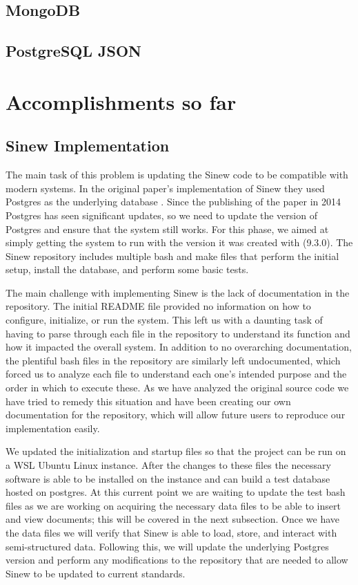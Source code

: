 \documentclass[sigconf]{acmart}
\begin{document}
    \subsection{MongoDB}


    \subsection{PostgreSQL JSON}

\section{Accomplishments so far}
    \subsection{Sinew Implementation}
    The main task of this problem is updating the Sinew code to be compatible with modern systems. In the original paper's implementation of Sinew they used Postgres as the underlying database \cite{Tahara_Diamond_Abadi_2014}. Since the publishing of the paper in 2014 Postgres has seen significant updates, so we need to update the version of Postgres and ensure that the system still works. For this phase, we aimed at simply getting the system to run with the version it was created with (9.3.0). The Sinew repository includes multiple bash and make files that perform the initial setup, install the database, and perform some basic tests.

    The main challenge with implementing Sinew is the lack of documentation in the repository. The initial README file provided no information on how to configure, initialize, or run the system. This left us with a daunting task of having to parse through each file in the repository to understand its function and how it impacted the overall system. In addition to no overarching documentation, the plentiful bash files in the repository are similarly left undocumented, which forced us to analyze each file to understand each one's intended purpose and the order in which to execute these. As we have analyzed the original source code we have tried to remedy this situation and have been creating our own documentation for the repository, which will allow future users to reproduce our implementation easily.

    We updated the initialization and startup files so that the project can be run on a WSL Ubuntu Linux instance. After the changes to these files the necessary software is able to be installed on the instance and can build a test database hosted on postgres. At this current point we are waiting to update the test bash files as we are working on acquiring the necessary data files to be able to insert and view documents; this will be covered in the next subsection. Once we have the data files we will verify that Sinew is able to load, store, and interact with semi-structured data. Following this, we will update the underlying Postgres version and perform any modifications to the repository that are needed to allow Sinew to be updated to current standards.
\end{document}
